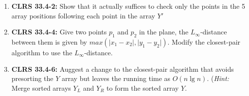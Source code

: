 \documentclass[12pt]{article}
\begin{document}
\begin{enumerate}[1.]
    \item \textbf{CLRS 33.4-2:} Show that it actually suffices to check only the
    points in the 5 array positions following each point in the array $Y'$

    \item \textbf{CLRS 33.4-4:} Give two points $p_1$ and $p_2$ in the plane, the $L_{\infty}$-distance
    between them is given by $max(\vert x_1 - x_2 \vert, \vert y_1 - y_2 \vert)$. Modify the closest-pair
    algorithm to use the $L_{\infty}$-distance.

    \item \textbf{CLRS 33.4-6:} Auggest a change to the closest-pair algorithm that avoids presorting the $Y$
    array but leaves the running time as $O(n \lg n)$. (\textit{Hint:} Merge sorted arrays $Y_L$ and $Y_R$ to
    form the sorted array $Y$.

\end{enumerate}
\end{document}
